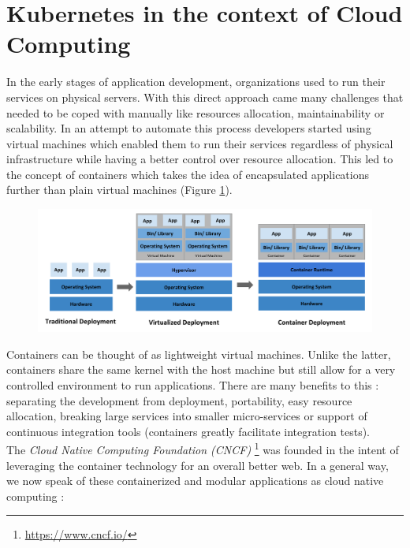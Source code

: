 \section{Kubernetes in the context of Cloud Computing}

In the early stages of application development, organizations used to run their
services on physical servers. With this direct approach came many challenges
that needed to be coped with manually like resources allocation,
maintainability or scalability. In an attempt to automate this process
developers started using virtual machines which enabled them to run their
services regardless of physical infrastructure while having a better control
over resource allocation.  This led to the concept of containers which takes
the idea of encapsulated applications further than plain virtual machines
(Figure \ref{fig:container-evolution}).

\begin{figure}[h]
	\centering
	\includegraphics[width=\textwidth]{./imgs/container_evolution.png}
	\label{fig:container-evolution}
\end{figure}

Containers can be thought of as lightweight virtual machines. Unlike the
latter, containers share the same kernel with the host machine but still allow
for a very controlled environment to run applications. There are many
benefits to this : separating the development from deployment, portability,
easy resource allocation, breaking large services into smaller micro-services
or support of continuous integration tools (containers greatly facilitate
integration tests).\\

The \textit{Cloud Native Computing Foundation (CNCF)
}\footnote{\url{https://www.cncf.io/}} was founded in the intent of leveraging
the container technology for an overall better web. In a general way, we now
speak of these containerized and modular applications as cloud native computing
:

